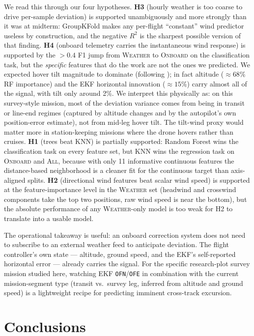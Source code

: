 \documentclass[sigconf, nonacm]{acmart}
\begin{document}
We read this through our four hypotheses.  \textbf{H3} (hourly weather
is too coarse to drive per-sample deviation) is supported unambiguously
and more strongly than it was at midterm: GroupKFold makes any
per-flight ``constant'' wind predictor useless by construction, and the
negative $R^2$ is the sharpest possible version of that finding.
\textbf{H4} (onboard telemetry carries the instantaneous wind response)
is supported by the $>0.4$ F1 jump from \textsc{Weather} to
\textsc{Onboard} on the classification task, but the \emph{specific}
features that do the work are not the ones we predicted.  We expected
hover tilt magnitude to dominate (following \cite{palomaki2017}); in
fact altitude ($\approx 68\%$ RF importance) and the EKF horizontal
innovation ($\approx 15\%$) carry almost all of the signal, with
tilt only around 2\%.  We interpret this physically as: on this
survey-style mission, most of the deviation variance comes from being
in transit or line-end regimes (captured by altitude changes and by
the autopilot's own position-error estimate), not from mid-leg hover
tilt.  The tilt-wind proxy would matter more in station-keeping
missions where the drone hovers rather than cruises.  \textbf{H1}
(trees beat KNN) is partially supported: Random Forest wins the
classification task on every feature set, but KNN wins the regression
task on \textsc{Onboard} and \textsc{All}, because with only 11
informative continuous features the distance-based neighborhood is a
cleaner fit for the continuous target than axis-aligned splits.
\textbf{H2} (directional wind features beat scalar wind speed) is
supported at the feature-importance level in the \textsc{Weather} set
(headwind and crosswind components take the top two positions, raw wind
speed is near the bottom), but the absolute performance of any
\textsc{Weather}-only model is too weak for H2 to translate into a
usable model.

The operational takeaway is useful: an onboard correction system does
not need to subscribe to an external weather feed to anticipate
deviation.  The flight controller's own state --- altitude, ground speed,
and the EKF's self-reported horizontal error --- already carries the
signal.  For the specific research-plot survey mission studied here,
watching EKF \texttt{OFN}/\texttt{OFE} in combination with the current
mission-segment type (transit vs.\ survey leg, inferred from altitude
and ground speed) is a lightweight recipe for predicting imminent
cross-track excursion.

\section{Conclusions}
\end{document}
